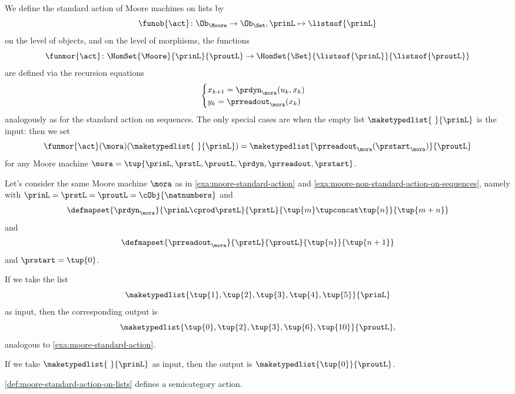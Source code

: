 \begin{definition}
\label{def:moore-standard-action-on-lists}
We define the standard action of Moore machines on lists by 
\begin{equation}
\funob{\act} \colon \Ob_{\Moore} \to \Ob_{\Set}, \prinL \mapsto \listsof{\prinL}
\end{equation}
on the level of objects, and on the level of morphisms, the functions 
\begin{equation}
\funmor{\act} \colon  \HomSet{\Moore}{\prinL}{\proutL} \to \HomSet{\Set}{ \listsof{\prinL}}{\listsof{\proutL}}
\end{equation}
are defined via the recursion equations
\begin{equation}
\label{eq:moore-recursion-once-again}
    \begin{cases}
        x_{k+1} = \prdyn_\mora(u_k, x_k) \\
        y_{k}   = \prreadout_\mora(x_{k})
    \end{cases}
\end{equation}
analogously as for the standard action on sequences. The only special cases are when the empty list $\maketypedlist{\ }{\prinL}$ is the input: then we set 
$$
\funmor{\act}(\mora)(\maketypedlist{\ }{\prinL}) = \maketypedlist{ \prreadout_\mora(\prstart_\mora) }{\proutL}
$$
for any Moore machine $\mora = \tup{\prinL,\prstL,\proutL,\prdyn,\prreadout,\prstart}$.
\end{definition}

\begin{example}
\label{exa:moore-non-standard-action-on-lists}
Let's consider the same Moore machine $\mora$ as in \cref{exa:moore-standard-action} and \cref{exa:moore-non-standard-action-on-sequences}, namely with $\prinL = \prstL = \proutL = \cObj{\natnumbers}$
and 
\begin{equation}
\defmapset{
\prdyn_\mora
}{
\prinL \cprod \prstL
}{
\prstL
}{
\tup{m} \tupconcat \tup{n}
}{
\tup{m + n}
}
\end{equation}
and 
\begin{equation}
\defmapset{
\prreadout_\mora
}{
\prstL
}{
\proutL
}{
\tup{n}
}{
\tup{n+1}
}
\end{equation}
and $\prstart = \tup{0}$. 

If we take the list 
$$
\maketypedlist{\tup{1}, \tup{2}, \tup{3}, \tup{4}, \tup{5}}{\prinL}
$$
as input, then the corresponding output is 
$$
\maketypedlist{\tup{0}, \tup{2}, \tup{3}, \tup{6}, \tup{10}}{\proutL},
$$
analogous to \cref{exa:moore-standard-action}. 

If we take $\maketypedlist{\ }{\prinL}$ as input, then the output is $\maketypedlist{\tup{0}}{\proutL}$.
\end{example}



\begin{lemma}
\cref{def:moore-standard-action-on-lists} defines a semicategory action. 
\end{lemma}





